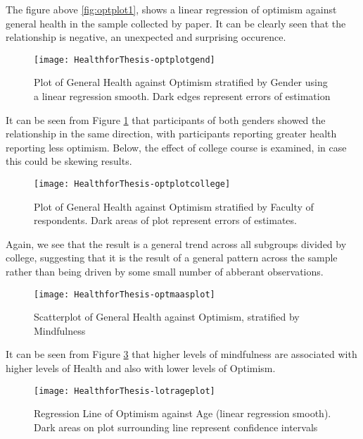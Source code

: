 \documentclass{article}
\begin{document}
The figure above \ref{fig:optplot1}, shows a linear regression of optimism against general health in the sample collected by paper.  It can be clearly seen that the relationship is negative, an unexpected and surprising occurence.  %




\begin{figure}
\texttt{[image: HealthforThesis-optplotgend]}
  \caption{Plot of General Health against Optimism stratified by Gender using a linear regression smooth. Dark edges represent errors of estimation}
  \label{fig:optplotgend}
\end{figure}


It can be seen from Figure \ref{fig:optplotgend} that participants of both genders showed the relationship in the same direction, with participants reporting greater health reporting less optimism.  Below, the effect of college course is examined, in case this could be skewing results.

\begin{figure}
\texttt{[image: HealthforThesis-optplotcollege]}
  \caption{Plot of General Health against Optimism stratified by Faculty of respondents. Dark areas of plot represent errors of estimates. }
  \label{fig:optplotcollege}
\end{figure}



Again, we see that the result is a general trend across all subgroups divided by college, suggesting that it is the result of a general pattern across the sample rather than being driven by some small number of abberant observations.


\begin{figure}
\texttt{[image: HealthforThesis-optmaasplot]}
  \caption{Scatterplot of General Health against Optimism, stratified by Mindfulness }
  \label{fig:optplotmaas}
\end{figure}


It can be seen from Figure \ref{fig:optplotmaas} that higher levels of mindfulness are associated with higher levels of Health and also with lower levels of Optimism.

\begin{figure}
\texttt{[image: HealthforThesis-lotrageplot]}
  \caption{Regression Line of Optimism against Age (linear regression smooth). Dark areas on plot surrounding line represent confidence intervals}
  \label{fig:lotrageplot}
\end{figure}
\end{document}
